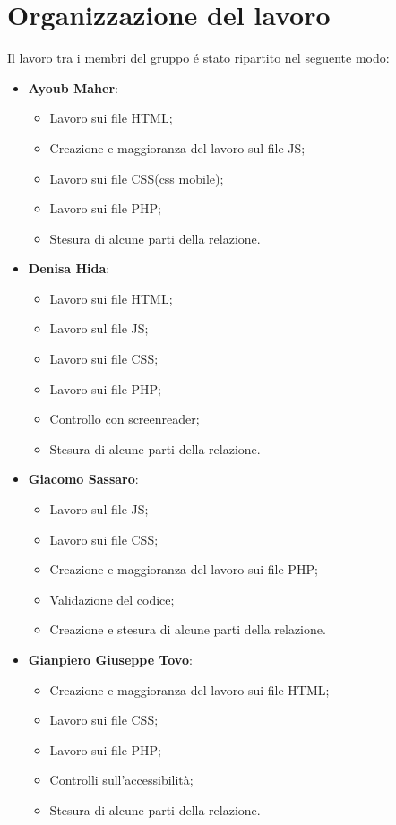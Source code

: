\section{Organizzazione del lavoro}
Il lavoro tra i membri del gruppo é stato ripartito nel seguente modo:
\begin{itemize}
	\item \textbf{Ayoub Maher}:
	\begin{itemize}
		\item Lavoro sui file HTML;
		\item Creazione e maggioranza del lavoro sul file JS;
		\item Lavoro sui file CSS(css mobile);
		\item Lavoro sui file PHP;
		\item Stesura di alcune parti della relazione.
	\end{itemize}
	
	\item \textbf{Denisa Hida}:
	\begin{itemize}
		\item Lavoro sui file HTML;
		\item Lavoro sul file JS;
		\item Lavoro sui file CSS;
		\item Lavoro sui file PHP;
		\item Controllo con screenreader;
		\item Stesura di alcune parti della relazione.
	\end{itemize}
	
	\item \textbf{Giacomo Sassaro}:
	\begin{itemize}
		\item Lavoro sul file JS;
		\item Lavoro sui file CSS;
		\item Creazione e maggioranza del lavoro sui file PHP;
		\item Validazione del codice;
		\item Creazione e stesura di alcune parti della relazione.
	\end{itemize}
	
	\item \textbf{Gianpiero Giuseppe Tovo}:
	\begin{itemize}
		\item Creazione e maggioranza del lavoro sui file HTML;
		\item Lavoro sui file CSS;
		\item Lavoro sui file PHP;
		\item Controlli sull'accessibilità;
		\item Stesura di alcune parti della relazione.
	\end{itemize}
	
\end{itemize}
